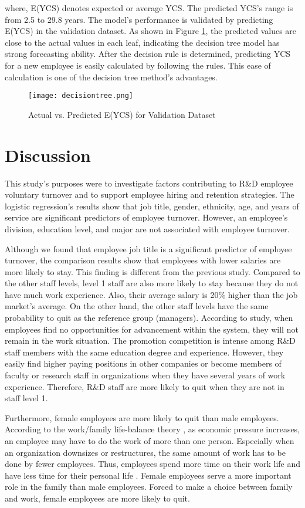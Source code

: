 where, E(YCS) denotes expected or average YCS. The predicted YCS's range is from 2.5 to 29.8 years. The model's performance is validated by predicting E(YCS) in the validation dataset. As shown in Figure \ref{fig:decsiontree}, the predicted values are close to the actual values in each leaf, indicating the decision tree model has strong forecasting ability. After the decision rule is determined, predicting YCS for a new employee is easily calculated by following the rules. This ease of calculation is one of the decision tree method's advantages. 
\begin{figure}
	\centering
	\texttt{[image: decisiontree.png]}
	\caption{Actual vs. Predicted E(YCS) for Validation Dataset}
	\label{fig:decsiontree}
\end{figure}
\section{Discussion}
This study's purposes were to investigate factors contributing to R\&D employee voluntary turnover and to support employee hiring and retention strategies. The logistic regression's results show that job title, gender, ethnicity, age, and years of service are significant predictors of employee turnover. However, an employee's division, education level, and major are not associated with employee turnover. 

Although we found that employee job title is a significant predictor of employee turnover, the comparison results show that employees with lower salaries are more likely to stay. This finding is different from the previous study. Compared to the other staff levels, level 1 staff are also more likely to stay because they do not have much work experience. Also, their average salary is 20\% higher than the job market's average. On the other hand, the other staff levels have the same probability to quit as the reference group (managers). According to \citet{RN37} study, when employees find no opportunities for advancement within the system, they will not remain in the work situation. The promotion competition is intense among R\&D staff members with the same education degree and experience. However, they easily find higher paying positions in other companies or become members of faculty or research staff in organizations when they have several years of work experience. Therefore, R\&D staff are more likely to quit when they are not in staff level 1.  

Furthermore, female employees are more likely to quit than male employees. According to the work/family life-balance theory \citep{RN38}, as economic pressure increases, an employee may have to do the work of more than one person. Especially when an organization downsizes or restructures, the same amount of work has to be done by fewer employees. Thus, employees spend more time on their work life and have less time for their personal life \citep{smith2009}. Female employees serve a more important role in the family than male employees. Forced to make a choice between family and work, female employees are more likely to quit. 

